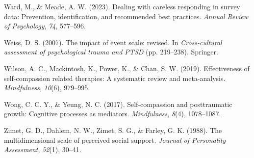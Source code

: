 \documentclass[
  man,floatsintext]{apa7}
\newlength{\cslhangindent}
\newlength{\cslentryspacingunit} %
\newenvironment{CSLReferences}[2] %
 {%
  \setlength{\parindent}{0pt}
  \ifodd #1
  \let\oldpar\par
  \def\par{\hangindent=\cslhangindent\oldpar}
  \fi
  \setlength{\parskip}{#2\cslentryspacingunit}
 }%
 {}
\begin{document}
\begin{CSLReferences}{1}{0}
\leavevmode{}%
Ward, M., \& Meade, A. W. (2023). Dealing with careless responding in survey data: Prevention, identification, and recommended best practices. \emph{Annual Review of Psychology}, \emph{74}, 577--596.

\leavevmode{}%
Weiss, D. S. (2007). The impact of event scale: revised. In \emph{Cross-cultural assessment of psychological trauma and PTSD} (pp. 219--238). Springer.

\leavevmode{}%
Wilson, A. C., Mackintosh, K., Power, K., \& Chan, S. W. (2019). Effectiveness of self-compassion related therapies: A systematic review and meta-analysis. \emph{Mindfulness}, \emph{10}(6), 979--995.

\leavevmode{}%
Wong, C. C. Y., \& Yeung, N. C. (2017). Self-compassion and posttraumatic growth: Cognitive processes as mediators. \emph{Mindfulness}, \emph{8}(4), 1078--1087.

\leavevmode{}%
Zimet, G. D., Dahlem, N. W., Zimet, S. G., \& Farley, G. K. (1988). The multidimensional scale of perceived social support. \emph{Journal of Personality Assessment}, \emph{52}(1), 30--41.

\end{CSLReferences}
\end{document}
